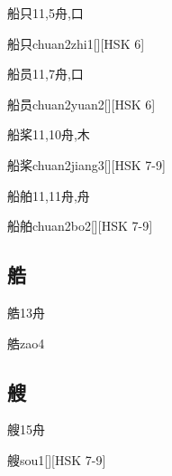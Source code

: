 \begin{Entry}{船只}{11,5}{⾈,⼝}
  \begin{Phonetics}{船只}{chuan2zhi1}[][HSK 6]
  \end{Phonetics}
\end{Entry}

\begin{Entry}{船员}{11,7}{⾈,⼝}
  \begin{Phonetics}{船员}{chuan2yuan2}[][HSK 6]
  \end{Phonetics}
\end{Entry}

\begin{Entry}{船桨}{11,10}{⾈,⽊}
  \begin{Phonetics}{船桨}{chuan2jiang3}[][HSK 7-9]
  \end{Phonetics}
\end{Entry}

\begin{Entry}{船舶}{11,11}{⾈,⾈}
  \begin{Phonetics}{船舶}{chuan2bo2}[][HSK 7-9]
  \end{Phonetics}
\end{Entry}

\subsection*{艁}

\begin{Entry}{艁}{13}{⾈}
  \begin{Phonetics}{艁}{zao4}
  \end{Phonetics}
\end{Entry}

\subsection*{艘}

\begin{Entry}{艘}{15}{⾈}
  \begin{Phonetics}{艘}{sou1}[][HSK 7-9]
  \end{Phonetics}
\end{Entry}


